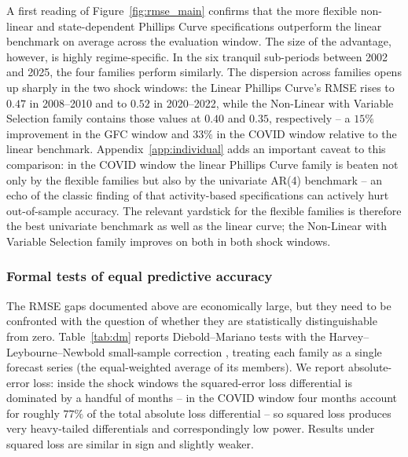 \documentclass[12pt,a4paper]{article}
\begin{document}
A first reading of Figure~\ref{fig:rmse_main} confirms that the more flexible non-linear and state-dependent Phillips Curve specifications outperform the linear benchmark on average across the evaluation window. The size of the advantage, however, is highly regime-specific. In the six tranquil sub-periods between 2002 and 2025, the four families perform similarly. The dispersion across families opens up sharply in the two shock windows: the Linear Phillips Curve's RMSE rises to $0.47$ in 2008--2010 and to $0.52$ in 2020--2022, while the Non-Linear with Variable Selection family contains those values at $0.40$ and $0.35$, respectively -- a $15\%$ improvement in the GFC window and $33\%$ in the COVID window relative to the linear benchmark. Appendix~\ref{app:individual} adds an important caveat to this comparison: in the COVID window the linear Phillips Curve family is beaten not only by the flexible families but also by the univariate AR(4) benchmark -- an echo of the classic finding of \citet{atkesonohanian2001} that activity-based specifications can actively hurt out-of-sample accuracy. The relevant yardstick for the flexible families is therefore the best univariate benchmark as well as the linear curve; the Non-Linear with Variable Selection family improves on both in both shock windows.

\subsubsection*{Formal tests of equal predictive accuracy}

The RMSE gaps documented above are economically large, but they need to be confronted with the question of whether they are statistically distinguishable from zero. Table~\ref{tab:dm} reports Diebold--Mariano tests \citep{diebold1995} with the Harvey--Leybourne--Newbold small-sample correction \citep{harvey1997}, treating each family as a single forecast series (the equal-weighted average of its members). We report absolute-error loss: inside the shock windows the squared-error loss differential is dominated by a handful of months -- in the COVID window four months account for roughly $77\%$ of the total absolute loss differential -- so squared loss produces very heavy-tailed differentials and correspondingly low power. Results under squared loss are similar in sign and slightly weaker.
\end{document}
